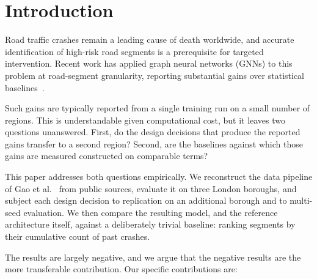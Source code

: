 \documentclass[conference]{IEEEtran}
\begin{document}
\section{Introduction}

Road traffic crashes remain a leading cause of death worldwide, and
accurate identification of high-risk road segments is a prerequisite for
targeted intervention. Recent work has applied graph neural networks
(GNNs) to this problem at road-segment granularity, reporting substantial
gains over statistical baselines~\cite{gao2024,nippani2023}.

Such gains are typically reported from a single training run on a small
number of regions. This is understandable given computational cost, but it
leaves two questions unanswered. First, do the design decisions that
produce the reported gains transfer to a second region? Second, are the
baselines against which those gains are measured constructed on comparable
terms?

This paper addresses both questions empirically. We reconstruct the data
pipeline of Gao et al.~\cite{gao2024} from public sources, evaluate it on
three London boroughs, and subject each design decision to replication on
an additional borough and to multi-seed evaluation. We then compare the
resulting model, and the reference architecture itself, against a
deliberately trivial baseline: ranking segments by their cumulative count
of past crashes.

The results are largely negative, and we argue that the negative results
are the more transferable contribution. Our specific contributions are:
\end{document}
